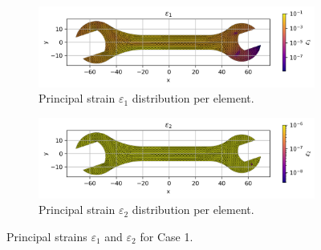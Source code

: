 \begin{figure}[H]
    \centering
    \begin{subfigure}[t]{0.49\textwidth}
      \centering
      \includegraphics[width=\textwidth]{GRAFICOS/Case b - epsilon_1_per_element.png}
      \caption{Principal strain $\varepsilon_1$ distribution per element.}
      \label{fig:epsilon_1_b}
    \end{subfigure}
    \hfill
    \begin{subfigure}[t]{0.49\textwidth}
      \centering
      \includegraphics[width=\textwidth]{GRAFICOS/Case b - epsilon_2_per_element.png}
      \caption{Principal strain $\varepsilon_2$ distribution per element.}
      \label{fig:epsilon_2_b}
    \end{subfigure}
    \caption{Principal strains $\varepsilon_1$ and $\varepsilon_2$ for Case 1.}
    \label{fig:principal_strains_b}
\end{figure}

